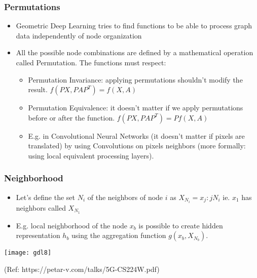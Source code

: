 \begin{frame}[fragile]\frametitle{Permutations}

\begin{itemize}
\item  Geometric Deep Learning tries to find functions to be  able to process graph data independently of node organization

\item  All the possible node combinations are defined by a mathematical operation called Permutation. The functions must respect: 
\begin{itemize}
\item Permutation Invariance: applying permutations shouldn’t modify the result. $f(PX,PAP^T )=f(X,A)$
\item Permutation Equivalence: it doesn’t matter if we apply permutations before or after the function. $f(PX, PAP^T)=Pf(X, A)$
\item E.g. in Convolutional Neural Networks (it doesn't matter if pixels are translated) by using Convolutions on pixels neighbors (more formally: using local equivalent processing layers).
\end{itemize}
	\end{itemize}


\end{frame}

\begin{frame}[fragile]\frametitle{Neighborhood}


\begin{itemize}
\item Let’s define the set $N_i$ of the neighbors of node $i$ as $X_{N_i}={x_j: j  N_i}$ ie. $x_1$ has neighbors called $X_{N_1}$
\item E.g. local neighborhood of the node $x_b$ is possible to create hidden representation $h_b$ using the aggregation function $g(x_b, X_{N_b})$.
 
\end{itemize}
	
\begin{center}
\texttt{[image: gdl8]}
\end{center}

{\tiny (Ref: https://petar-v.com/talks/5G-CS224W.pdf)}	

\end{frame}

